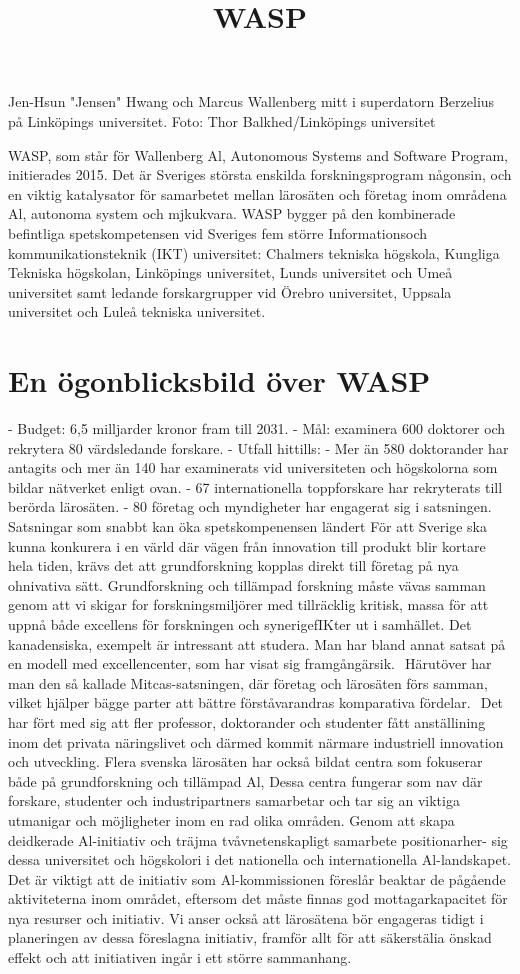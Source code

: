 {{{{{{{{Jen-Hsun "Jensen" Hwang och Marcus Wallenberg mitt i superdatorn Berzelius på Linköpings universitet. Foto: Thor Balkhed/Linköpings universitet

\title{
WASP
}
WASP, som står för Wallenberg Al, Autonomous Systems and Software Program, initierades 2015. Det är Sveriges största enskilda forskningsprogram någonsin, och en viktig katalysator för samarbetet mellan lärosäten och företag inom områdena Al, autonoma system och mjkukvara.
WASP bygger på den kombinerade befintliga spetskompetensen vid Sveriges fem större Informationsoch kommunikationsteknik (IKT) universitet: Chalmers tekniska högskola, Kungliga Tekniska högskolan, Linköpings universitet, Lunds universitet och Umeå universitet samt ledande forskargrupper vid Örebro universitet, Uppsala universitet och Luleå tekniska universitet.
\section*{En ögonblicksbild över WASP}
- Budget: 6,5 milljarder kronor fram till 2031.
- Mål: examinera 600 doktorer och rekrytera 80 värdsledande forskare.
- Utfall hittills:
- Mer än 580 doktorander har antagits och mer än 140 har examinerats vid universiteten och högskolorna som bildar nätverket enligt ovan.
- 67 internationella toppforskare har rekryterats till berörda lärosäten.
- 80 företag och myndigheter har engagerat sig i satsningen.
Satsningar som snabbt kan öka spetskompenensen ländert
För att Sverige ska kunna konkurera i en värld där vägen från innovation till produkt blir kortare hela tiden, krävs det att grundforskning kopplas direkt till företag på nya ohnivativa sätt. Grundforskning och tillämpad forskning måste vävas samman genom att vi skigar for forskningsmiljörer med tillräcklig kritisk, massa för att uppnå både excellens för forskningen och synerigefIKter ut i samhället. Det kanadensiska, exempelt är intressant att studera. Man har bland annat satsat på en modell med excellencenter, som har visat sig framgångärsik. \({ }^{}\) Härutöver har man den så kallade Mitcas-satsningen, där företag och lärosäten förs samman, vilket hjälper bägge parter att bättre förståvarandras komparativa fördelar. \({ }^{}\) Det har fört med sig att fler professor, doktorander och studenter fått anställining inom det privata näringslivet och därmed kommit närmare industriell innovation och utveckling.
Flera svenska lärosäten har också bildat centra som fokuserar både på grundforskning och tillämpad Al, Dessa centra fungerar som nav där forskare, studenter och industripartners samarbetar och tar sig an viktiga utmanigar och möjligheter inom en rad olika områden. Genom att skapa deidkerade Al-initiativ och träjma tvåvnetenskapligt samarbete positionarher-
sig dessa universitet och högskolori i det nationella och internationella Al-landskapet. Det är viktigt att de initiativ som Al-kommissionen föreslår beaktar de pågående aktiviteterna inom området, eftersom det måste finnas god mottagarkapacitet för nya resurser och initiativ. Vi anser också att lärosätena bör engageras tidigt i planeringen av dessa föreslagna initiativ, framför allt för att säkerstälia önskad effekt och att initiativen ingår i ett större sammanhang.
}}}}}}}}

